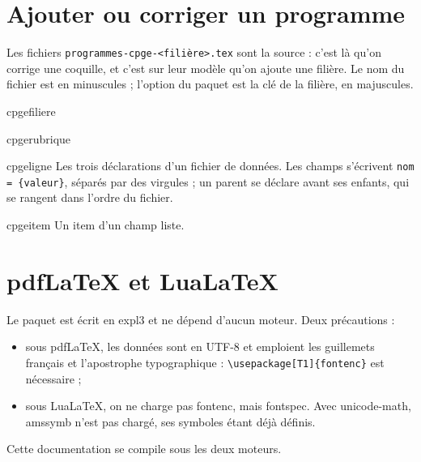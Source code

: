 \documentclass[a4paper,11pt]{article}
\newcommand\pkg[1]{\textsf{#1}}
\begin{document}
\section{Ajouter ou corriger un programme}

Les fichiers \texttt{programmes-cpge-<filière>.tex} sont la source : c'est là
qu'on corrige une coquille, et c'est sur leur modèle qu'on ajoute une filière.
Le nom du fichier est en minuscules ; l'option du paquet est la clé de la
filière, en majuscules.

\begin{docCommand}{cpgefiliere}{}\end{docCommand}
\begin{docCommand}{cpgerubrique}{}\end{docCommand}
\begin{docCommand}{cpgeligne}{}
  Les trois déclarations d'un fichier de données. Les champs s'écrivent
  \texttt{nom = \{valeur\}}, séparés par des virgules ; un parent se déclare
  avant ses enfants, qui se rangent dans l'ordre du fichier.
\end{docCommand}

\begin{docCommand}{cpgeitem}{}
  Un item d'un champ liste.
\end{docCommand}

\begin{dispListing}
\end{dispListing}

\section{pdf\LaTeX{} et Lua\LaTeX}

Le paquet est écrit en expl3 et ne dépend d'aucun moteur. Deux précautions :
\begin{itemize}
  \item sous pdf\LaTeX, les données sont en UTF-8 et emploient les guillemets
    français et l'apostrophe typographique : \verb|\usepackage[T1]{fontenc}|
    est nécessaire ;
  \item sous Lua\LaTeX, on ne charge pas \pkg{fontenc}, mais \pkg{fontspec}.
    Avec \pkg{unicode-math}, \pkg{amssymb} n'est pas chargé, ses symboles étant
    déjà définis.
\end{itemize}
Cette documentation se compile sous les deux moteurs.
\end{document}
